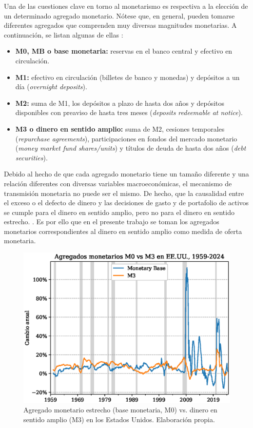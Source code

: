 \documentclass[titlepage, 12pt]{article}
\begin{document}
Una de las cuestiones clave en torno al monetarismo es respectiva a la elección de un determinado agregado monetario. Nótese que, en general, pueden tomarse diferentes agregados que comprenden muy diversas magnitudes monetarias. A continuación, se listan algunas de ellas \autocite{oecd}:
\begin{itemize}
    \item \textbf{M0, MB o base monetaria:} reservas en el banco central y efectivo en circulación.
    \item \textbf{M1:} efectivo en circulación (billetes de banco y monedas) y depósitos a un día (\textit{overnight deposits}).
    \item  \textbf{M2:} suma de M1, los depósitos a plazo de hasta dos años y depósitos disponibles con preaviso de hasta tres meses (\textit{deposits redeemable at notice}).
    \item \textbf{M3 o dinero en sentido amplio:} suma de M2, cesiones temporales (\textit{repurchase agreements}), participaciones en fondos del mercado monetario (\textit{money market fund shares/units}) y títulos de deuda de hasta dos años (\textit{debt securities}).
\end{itemize}

Debido al hecho de que cada agregado monetario tiene un tamaño diferente y una relación diferentes con diversas variables macroeconómicas, el mecanismo de transmisión monetaria no puede ser el mismo. De hecho, que la causalidad entre el exceso o el defecto de dinero y las decisiones de gasto y de portafolio de activos se cumple para el dinero en sentido amplio, pero no para el dinero en sentido estrecho.  \autocite[137]{congdon2024}. Es por ello que en el presente trabajo se toman los agregados monetarios correspondientes al dinero en sentido amplio como medida de oferta monetaria.

\newpage
\begin{figure}
    \centering
    \includegraphics[width=.8\textwidth]{plots/broad-vs-narrow-money.eps}
    \caption{Agregado monetario estrecho (base monetaria, M0) vs. dinero en sentido amplio (M3) en los Estados Unidos. Elaboración propia.}
    \label{fig:broad-vs-narrow-money}
\end{figure}
\end{document}
